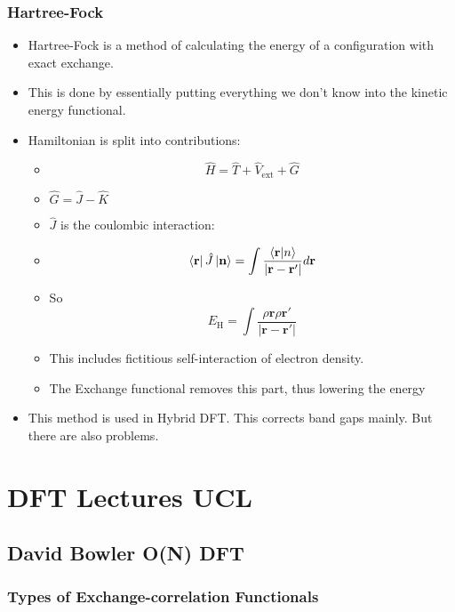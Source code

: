 \documentclass[11pt]{article}
\begin{document}
\subsubsection{Hartree-Fock}
\label{sec-3-2-1}
\begin{itemize}
\item Hartree-Fock is a method of calculating the energy of a configuration
with exact exchange.
\item This is done by essentially putting everything we don't know into the
kinetic energy functional.
\item Hamiltonian is split into contributions:
\begin{itemize}
\item \[\hat{H} = \hat{T} + \hat{V}_{ \text{ext} } + \hat{G}\]
\item $\hat{G} = \hat{J} - \hat{K}$
\item $\hat{J}$ is the coulombic interaction:
\item \[ \bra{ \mathbf{r} } \hat{J} \ket{ \mathbf{n} } = \int \frac{ \bra{\mathbf{r}}\ket{n} }{|\mathbf{r} - \mathbf{r'}  |}d\mathbf{r} \]
\item So \[ E_{\text{H}} = \int \frac{\rho{\mathbf{r}\rho{\mathbf{r}'}}}{|\mathbf{r} - \mathbf{r'}|}\]
\item This includes fictitious self-interaction of electron density.
\item The Exchange functional removes this part, thus lowering the energy
\end{itemize}

\item This method is used in Hybrid DFT. This corrects band gaps mainly. But
there are also problems.
\end{itemize}


\section{DFT Lectures UCL}
\label{sec-4}
\subsection{David Bowler O(N) DFT}
\label{sec-4-1}
\subsubsection{Types of Exchange-correlation Functionals}
\label{sec-4-1-1}
\end{document}
